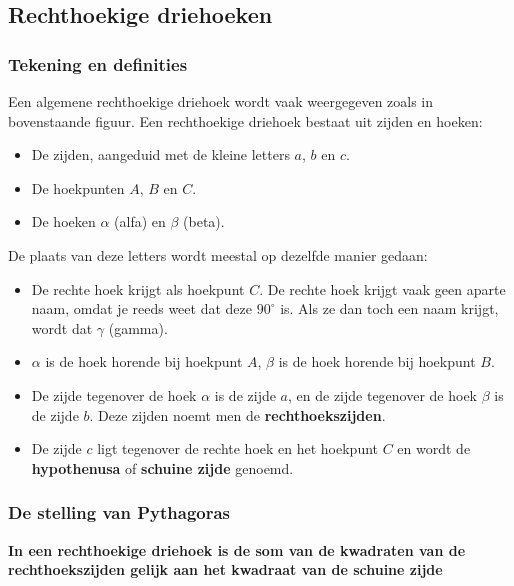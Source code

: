 \subsection{Rechthoekige driehoeken}


\subsubsection{Tekening en definities}


\begin{figure}[H]
	\centering 
	 
\end{figure}


Een algemene rechthoekige driehoek wordt vaak weergegeven zoals in bovenstaande figuur. Een rechthoekige driehoek bestaat uit zijden en hoeken:
\begin{itemize}
	\item De zijden, aangeduid met de kleine letters $a$, $b$ en $c$.
	\item De hoekpunten $A$, $B$ en $C$.
	\item De hoeken $\alpha$ (alfa) en $\beta$ (beta).
\end{itemize}

De plaats van deze letters wordt meestal op dezelfde manier gedaan:
\begin{itemize}
	\item De rechte hoek krijgt als hoekpunt $C$. De rechte hoek krijgt vaak geen aparte naam, omdat je reeds weet dat deze $90^\circ$ is. Als ze dan toch een naam krijgt, wordt dat $\gamma$ (gamma).
	\item $\alpha$ is de hoek horende bij hoekpunt $A$, $\beta$ is de hoek horende bij hoekpunt $B$.
	\item De zijde tegenover de hoek $\alpha$ is de zijde $a$, en de zijde tegenover de hoek $\beta$ is de zijde $b$. Deze zijden noemt men de \textbf{rechthoekszijden}.
	\item De zijde $c$ ligt tegenover de rechte hoek en het hoekpunt $C$ en wordt de \textbf{hypothenusa} of \textbf{schuine zijde} genoemd.
\end{itemize}

\newpage

\subsubsection{De stelling van Pythagoras}

\begin{center}\textbf{In een rechthoekige driehoek is de 
		som van de kwadraten van de rechthoekszijden gelijk aan het kwadraat van de schuine zijde}\end{center}


